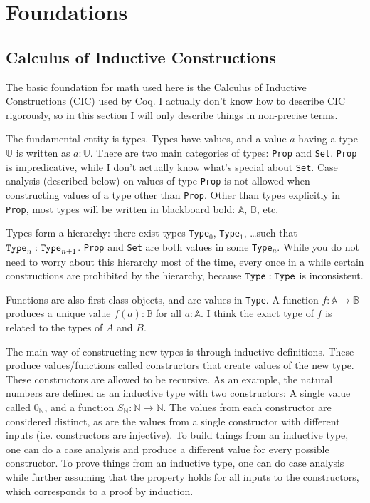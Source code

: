 \documentclass[../math.tex]{subfiles}
\begin{document}
\chapter{Foundations} \label{chap-foundations}

\section{Calculus of Inductive Constructions}

The basic foundation for math used here is the Calculus of Inductive
Constructions (CIC) used by Coq.  I actually don't know how to describe CIC
rigorously, so in this section I will only describe things in non-precise terms.

The fundamental entity is types.  Types have values, and a value $a$ having a
type $\mathbb U$ is written as $a : \mathbb U$.  There are two main categories
of types: \verb|Prop| and \verb|Set|.  \verb|Prop| is impredicative, while I
don't actually know what's special about \verb|Set|.  Case analysis (described
below) on values of type \verb|Prop| is not allowed when constructing values of
a type other than \verb|Prop|.  Other than types explicitly in \verb|Prop|, most
types will be written in blackboard bold: $\mathbb A$, $\mathbb B$, etc.

Types form a hierarchy: there exist types \verb|Type|$_0$, \verb|Type|$_1$,
\ldots such that $\verb|Type|_n : \verb|Type|_{n + 1}$.  \verb|Prop| and
\verb|Set| are both values in some \verb|Type|$_n$.  While you do not need to
worry about this hierarchy most of the time, every once in a while certain
constructions are prohibited by the hierarchy, because $\verb|Type| :
\verb|Type|$ is inconsistent.

Functions are also first-class objects, and are values in \verb|Type|.  A
function $f : \mathbb A \rightarrow \mathbb B$ produces a unique value $f(a) :
\mathbb B$ for all $a : \mathbb A$.  I think the exact type of $f$ is related to
the types of $A$ and $B$.

The main way of constructing new types is through inductive definitions.  These
produce values/functions called constructors that create values of the new type.
These constructors are allowed to be recursive.  As an example, the natural
numbers are defined as an inductive type with two constructors: A single value
called $0_{\mathbb N}$, and a function $S_{\mathbb N} : \mathbb N \rightarrow
\mathbb N$.  The values from each constructor are considered distinct, as are
the values from a single constructor with different inputs (i.e. constructors
are injective).  To build things from an inductive type, one can do a case
analysis and produce a different value for every possible constructor.  To prove
things from an inductive type, one can do case analysis while further assuming
that the property holds for all inputs to the constructors, which corresponds to
a proof by induction.
\end{document}
